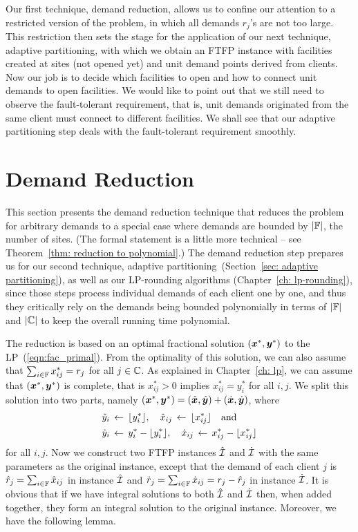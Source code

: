 \documentclass[oneside,final]{ucr}
\begin{document}
Our first technique, demand reduction, allows us to confine
our attention to a restricted version of the {\FTFP}
problem, in which all demands $r_j$'s are not too
large. This restriction then sets the stage for the
application of our next technique, adaptive partitioning,
with which we obtain an FTFP instance with facilities
created at sites (not opened yet) and unit demand points
derived from clients. Now our job is to decide which
facilities to open and how to connect unit demands to open
facilities. We would like to point out that we still need to
observe the fault-tolerant requirement, that is, unit
demands originated from the same client must connect to
different facilities. We shall see that our adaptive
partitioning step deals with the fault-tolerant requirement
smoothly.

\section{Demand Reduction}
\label{sec: polynomial demands}

This section presents the demand reduction technique that
reduces the {\FTFP} problem for arbitrary demands to a
special case where demands are bounded by $|\mathbb{F}|$, the
number of sites.  (The formal statement is a little more
technical -- see Theorem~\ref{thm: reduction to
  polynomial}.)  The demand reduction step prepares us for
our second technique, adaptive
partitioning~(Section~\ref{sec: adaptive partitioning}), as
well as our LP-rounding algorithms (Chapter~\ref{ch:
  lp-rounding}), since those steps process individual
demands of each client one by one, and thus they critically
rely on the demands being bounded polynomially in terms of
$|\mathbb{F}|$ and $|\mathbb{C}|$ to keep the overall running
time polynomial.

The reduction is based on an optimal fractional solution
$(\boldsymbol{x}^\ast,\boldsymbol{y}^\ast)$ to the
LP~(\ref{eqn:fac_primal}). From the optimality of this
solution, we can also assume that $\sum_{i\in\mathbb{F}}
x^\ast_{ij} = r_j$ for all $j\in\mathbb{C}$.  As explained
in Chapter~\ref{ch: lp}, we can assume that
$(\boldsymbol{x}^\ast,\boldsymbol{y}^\ast)$ is complete, that is $x^\ast_{ij} >
0$ implies $x^\ast_{ij} = y^\ast_i$ for all $i,j$.  We split
this solution into two parts, namely $(\boldsymbol{x}^\ast,\boldsymbol{y}^\ast)
= (\hat{\boldsymbol{x}},\hat{\boldsymbol{y}})+ (\dot{\boldsymbol{x}},\dot{\boldsymbol{y}})$, where
%
\begin{align*}
{\hat y}_i &\;{\,\leftarrow\,}\; { \lfloor y_i^\ast \rfloor }, \quad
			{\hat x}_{ij} \;{\,\leftarrow\,}\; { \lfloor x_{ij}^\ast \rfloor } \quad\textrm{and}
			\\
{\dot y}_i &\;{\,\leftarrow\,}\; y_i^\ast - { \lfloor y_i^\ast \rfloor }, \quad
 	{\dot x}_{ij} \;{\,\leftarrow\,}\; x_{ij}^\ast -  { \lfloor x_{ij}^\ast \rfloor }
\end{align*}
%
for all $i,j$. Now we construct two
FTFP instances $\hatcalI$ and $\dotcalI$ with the same
parameters as the original instance, except that the demand of each client $j$ is
${\hat r}_j = \sum_{i\in\mathbb{F}} {\hat x}_{ij}$ in instance $\hatcalI$ and
${\dot r}_j = \sum_{i\in\mathbb{F}} {\dot x}_{ij} = r_j - {\hat r}_j$ in instance $\dotcalI$. 
It is obvious that if we have integral solutions to both $\hatcalI$
and $\dotcalI$ then, when added together, they form an integral
solution to the original instance.  Moreover, we have the
following lemma.
\end{document}

